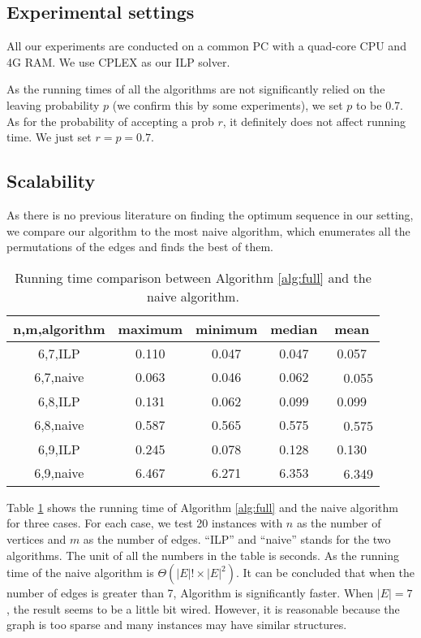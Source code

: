 \documentclass[letterpaper]{article}
\begin{document}
\subsection{Experimental settings}
All our experiments are conducted on a common PC with a quad-core CPU and 4G RAM.
We use CPLEX as our ILP solver.

As the running times of all the algorithms are not significantly relied on the leaving probability $p$ (we confirm this by some experiments), we set  $p$ to be 0.7.
As for the probability of accepting a prob $r$, it definitely does not affect running time. We just set $r=p=0.7$.

\subsection{Scalability}

As there is no previous literature on finding the optimum sequence in our setting, we compare our algorithm to the most naive algorithm, which enumerates all the permutations of the edges and finds the best of them.
\begin{table}
	\tiny
	\centering
	\caption{Running time comparison between Algorithm \ref{alg:full} and the naive algorithm.}
	\label{tab1}
	\begin{tabular}{ccccc}
		\hline
		n,m,algorithm & maximum & minimum & median & mean\\ \hline
		6,7,ILP & 0.110& 0.047& 0.047& 0.057\\
		6,7,naive & 0.063& 0.046& 0.062&　0.055\\
		6,8,ILP & 0.131& 0.062& 0.099& 0.099\\
		6,8,naive & 0.587& 0.565& 0.575&　0.575\\
		6,9,ILP & 0.245& 0.078& 0.128& 0.130\\
		6,9,naive & 6.467& 6.271& 6.353&　6.349\\ \hline
	\end{tabular}
\end{table}

Table \ref{tab1} shows the running time of Algorithm \ref{alg:full} and the naive algorithm for three cases.
For each case, we test 20 instances with $n$ as the number of vertices and $m$ as the number of edges.
``ILP'' and ``naive'' stands for the two algorithms.
The unit of all the numbers in the table is seconds.
As the running time of the naive algorithm is $\Theta(|E|!\times |E|^2)$.
It can be concluded that when the number of edges is greater than 7, Algorithm is significantly faster.
When $|E|=7$, the result seems to be a little bit wired.
However, it is reasonable because the graph is too sparse and many instances may have similar structures.
\end{document}

